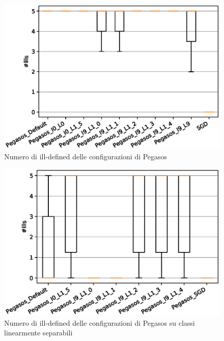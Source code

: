 \documentclass[12pt,a4paper,oneside,hidelinks]{report}
\begin{document}
\vspace*{\fill}

\begin{figure}[ht]%
    \centering
    \includegraphics[scale = 0.80]{CC-Pegasos-ills.eps}%
    \caption{Numero di ill-defined delle configurazioni di Pegasos}%
    \label{figure:ill13}%
\end{figure}

\begin{figure}[hb]%
    \centering
    \includegraphics[scale = 0.80]{CC-Pegasos-ills-LS.eps}%
    \caption{Numero di ill-defined delle configurazioni di Pegasos su classi linearmente separabili}%
    \label{figure:ill14}%
\end{figure}

\vspace*{\fill}

\end{document}

